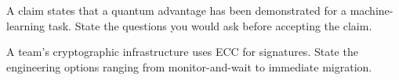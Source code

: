 \begin{exercise}
A claim states that a quantum advantage has been demonstrated for a machine-learning task. State the questions you would ask before accepting the claim.
\end{exercise}

\begin{exercise}
A team's cryptographic infrastructure uses ECC for signatures. State the engineering options ranging from monitor-and-wait to immediate migration.
\end{exercise}
